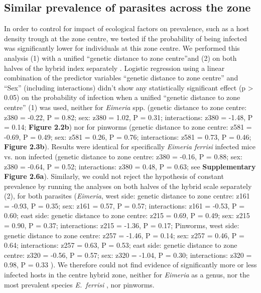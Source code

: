 \subsection{Similar prevalence of parasites across the zone}
In order to control for impact of ecological factors on prevalence, such as a host density trough at the zone centre, we tested if the probability of being infected was significantly lower for individuals at this zone centre. We performed this analysis (1) with a unified “genetic distance to zone centre”and (2) on both halves of the hybrid index separately . Logistic regression using a linear combination of the predictor variables “genetic distance to zone centre” and “Sex” (including interactions) didn’t show any statistically significant effect (p > 0.05) on the probability of infection when a unified “genetic distance to zone centre” (1) was used, neither for \textit{Eimeria} spp. (genetic distance to zone centre: z380 = -0.22, P = 0.82; sex: z380 = 1.02, P = 0.31; interactions: z380 = -1.48, P = 0.14; \textbf{Figure 2.2b}) nor for pinworms (genetic distance to zone centre: z581 = -0.69, P = 0.49; sex: z581 = 0.26, P = 0.76; interactions: z581 = 0.73, P = 0.46; \textbf{Figure 2.3b}). Results were identical for specifically \textit{Eimeria ferrisi} infected mice vs. non infected (genetic distance to zone centre: z380 = -0.16, P = 0.88; sex: z380 = -0.64, P = 0.52; interactions: z380 = 0.48, P = 0.63; see \textbf{Supplementary Figure 2.6a}). Similarly, we could not reject the hypothesis of constant prevalence by running the analyses on both halves of the hybrid scale separately (2), for both parasites (\textit{Eimeria}, west side: genetic distance to zone centre: z161 = -0.93, P = 0.35; sex: z161 = 0.57, P = 0.57; interactions: z161 = -0.53, P = 0.60; east side: genetic distance to zone centre: z215 = 0.69, P = 0.49; sex: z215 = 0.90, P = 0.37; interactions: z215 = -1.36, P = 0.17; Pinworms, west side: genetic distance to zone centre: z257 = -1.46, P = 0.14; sex: z257 = 0.46, P = 0.64; interactions: z257 = 0.63, P = 0.53; east side: genetic distance to zone centre: z320 = -0.56, P = 0.57; sex: z320 = -1.04, P = 0.30; interactions: z320 = 0.98, P = 0.33 ). We therefore could not find evidence of significantly more or less infected hosts in the centre hybrid zone, neither for \textit{Eimeria} as a genus, nor the most prevalent species \textit{E.~ferrisi} , nor pinworms. 

